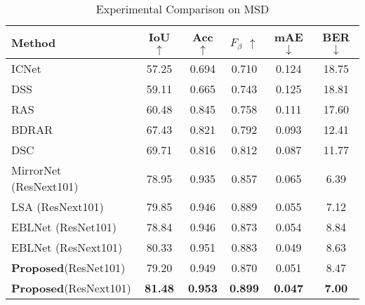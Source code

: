 \documentclass[10pt,twocolumn,letterpaper]{article}
\begin{document}
\begin{table}\scriptsize
    \centering
    \begin{tabular}{lccccc} %
    \toprule
    Method & IoU $\uparrow$ & Acc$\uparrow$ &${F}_{\beta}$ $\uparrow$& mAE $\downarrow$ &BER $\downarrow$\\
    \midrule
    ICNet \cite{zhao2018icnet}  & 57.25 &0.694&0.710 & 0.124 &18.75\\
    DSS\cite{hou2017deeply}  & 59.11 & 0.665  &0.743  & 0.125 & 18.81\\
    RAS\cite{chen2018reverse}  & 60.48 & 0.845 &0.758     & 0.111 & 17.60\\
    BDRAR\cite{zhu2018bidirectional}  & 67.43 & 0.821 &0.792     & 0.093 & 12.41\\
    DSC\cite{hu2018direction}  & 69.71 & 0.816  &0.812    & 0.087 & 11.77\\
    MirrorNet\cite{yang2019my} (ResNext101)  &78.95 & 0.935 &0.857 & 0.065 & 6.39\\
    LSA \cite{guan2022learning} (ResNext101) &79.85 & 0.946 & 0.889    & 0.055 & 7.12\\
    EBLNet \cite{he2021enhanced} (ResNet101) & 78.84 & 0.946   &0.873  & 0.054 & 8.84\\
    EBLNet \cite{he2021enhanced} (ResNext101) & 80.33  & 0.951 &0.883    & 0.049 &8.63\\
    \midrule
    \textbf{Proposed}(ResNet101)  & 79.20 &0.949 &0.870& 0.051 & 8.47\\
    \textbf{Proposed}(ResNext101)  & \textbf{81.48}  & \textbf{0.953} & \textbf{0.899}& \textbf{0.047} &\textbf{7.00}\\
    \bottomrule
    \end{tabular}
        \vspace*{-2mm}
    \caption{Experimental Comparison on MSD}
            \vspace*{-1mm}
        \label{MSD}

\end{table}
\end{document}
